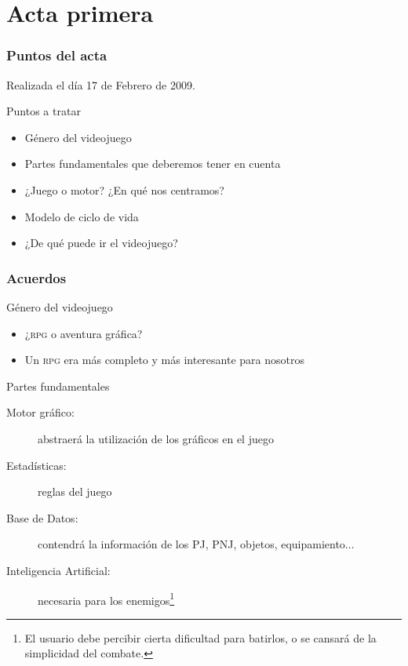 \documentclass[9pt,xcolor=svgnames]{beamer}
\begin{document}
  
 \section{Acta primera}

 \begin{frame}
  \frametitle{Puntos del acta}
  \transdissolve

  Realizada el día 17 de Febrero de 2009.
  
  \begin{block}{Puntos a tratar}
   \begin{itemize}
    \item Género del videojuego
    \item Partes fundamentales que deberemos tener en cuenta
    \item ¿Juego o motor? ¿En qué nos centramos?
    \item Modelo de ciclo de vida
    \item ¿De qué puede ir el videojuego?
   \end{itemize}
  \end{block}
 \end{frame}

 \begin{frame}
  \frametitle{Acuerdos}
  \transdissolve
  
  \begin{block}{Género del videojuego}
   \begin{itemize}
    \item ¿\textsc{rpg} o aventura gráfica?
    \item Un \textsc{rpg} era más completo y más interesante para
	  nosotros
   \end{itemize}
  \end{block}

  \begin{block}{Partes fundamentales}   
   \begin{description}
    \item[Motor gráfico: ] abstraerá la utilización de los gráficos en
	       el juego
    \item[Estadísticas: ] reglas del juego
    \item[Base de Datos: ] contendrá la información de los PJ, PNJ,
	       objetos, equipamiento...
    \item[Inteligencia Artificial: ] necesaria para los
	       enemigos\footnote{El usuario debe percibir cierta
	       dificultad para batirlos, o se cansará de la simplicidad
	       del combate.}
   \end{description}
  \end{block}
 \end{frame}
\end{document}
